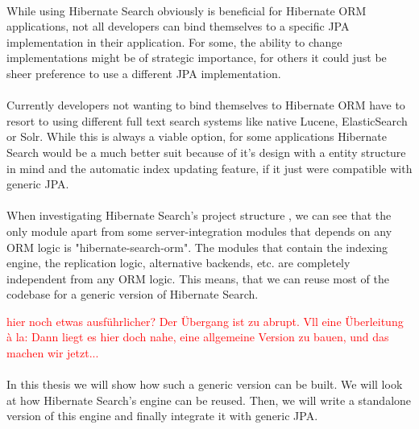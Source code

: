 \\
While using Hibernate Search obviously is beneficial for Hibernate ORM applications, not all developers can bind themselves to a specific JPA implementation in their application. For some, the ability to change implementations might be of strategic importance, for others it could just be sheer preference to use a different JPA implementation.
\\\\
Currently developers not wanting to bind themselves to Hibernate ORM have to resort to using different full text search systems like native Lucene, ElasticSearch or Solr. While this is always a viable option, for some applications Hibernate Search would be a much better suit because of it's design with a entity structure in mind and the automatic index updating feature, if it just were compatible with generic JPA.
\\\\
When investigating Hibernate Search's project structure \cite{source-code-git}, we can see that the only module apart from some server-integration modules that depends on any ORM logic is "hibernate-search-orm". The modules that contain the indexing engine, the replication logic, alternative backends, etc. are completely independent from any ORM logic. This means, that we can reuse most of the codebase for a generic version of Hibernate Search.

\textcolor{red}{hier noch etwas ausführlicher? Der Übergang ist zu abrupt. Vll eine Überleitung à la: Dann liegt es hier doch nahe, eine allgemeine Version zu bauen, und das machen wir jetzt...}
\\\\
In this thesis we will show how such a generic version can be built. We will look at how Hibernate Search's engine can be reused. Then, we will write a standalone version of this engine and finally integrate it with generic JPA.

\pagebreak
